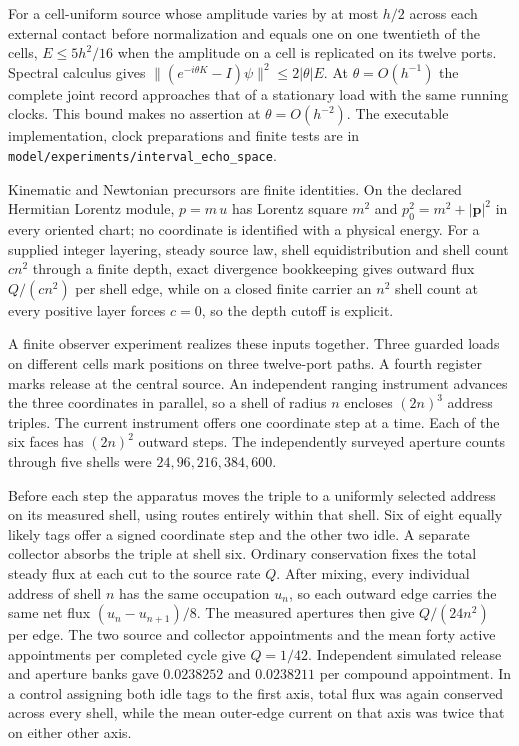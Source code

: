 \documentclass[11pt]{article}
\begin{document}
For a cell-uniform source whose amplitude varies by at most $h/2$ across
each external contact before normalization and equals one on one twentieth
of the cells, $E\leq 5h^2/16$ when the amplitude on a cell is replicated
on its twelve ports. Spectral calculus gives
$\|(e^{-i\theta K}-I)\psi\|^2\leq2|\theta|E$. At $\theta=O(h^{-1})$ the
complete joint record approaches that of a stationary load with the same
running clocks. This bound makes no assertion at $\theta=O(h^{-2})$.
The executable implementation, clock preparations and finite tests are in
\texttt{model/experiments/interval\_echo\_space}.

Kinematic and Newtonian precursors are finite identities. On the declared
Hermitian Lorentz module, $p=m\,u$ has Lorentz square $m^2$ and
$p_0^2=m^2+|\mathbf p|^2$ in every oriented chart; no coordinate is identified
with a physical energy. For a supplied integer layering, steady source law,
shell equidistribution and shell count $c n^2$ through a finite depth, exact
divergence bookkeeping gives outward flux $Q/(c n^2)$ per shell edge, while on
a closed finite carrier an $n^2$ shell count at every positive layer forces
$c=0$, so the depth cutoff is explicit.

A finite observer experiment realizes these inputs together. Three
guarded loads on different cells mark positions on three twelve-port
paths. A fourth register marks release at the central source. An
independent ranging instrument advances the three coordinates in
parallel, so a shell of radius $n$ encloses $(2n)^3$ address triples.
The current instrument offers one coordinate step at a time. Each of
the six faces has $(2n)^2$ outward steps. The independently surveyed
aperture counts through five shells were $24,96,216,384,600$.

Before each step the apparatus moves the triple to a uniformly
selected address on its measured shell, using routes entirely within
that shell. Six of eight equally likely tags offer a signed coordinate
step and the other two idle. A separate collector absorbs the triple
at shell six. Ordinary conservation fixes the total steady flux at each
cut to the source rate $Q$. After mixing, every individual address of
shell $n$ has the same occupation $u_n$, so each outward edge carries
the same net flux $(u_n-u_{n+1})/8$. The measured apertures then
give $Q/(24n^2)$ per edge. The two source and collector appointments
and the mean forty active appointments per completed cycle give
$Q=1/42$. Independent simulated release and aperture banks gave
$0.0238252$ and $0.0238211$ per compound appointment.
In a control assigning both idle tags to the first axis, total flux
was again conserved across every shell, while the mean outer-edge
current on that axis was twice that on either other axis.
\end{document}
